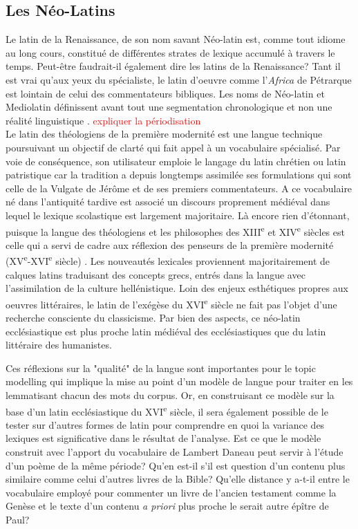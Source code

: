 \documentclass[11pt,french]{article}
\begin{document}
\subsection{Les Néo-Latins}
Le latin de la Renaissance, de son nom savant Néo-latin est, comme tout idiome au long cours, constitué de différentes strates de lexique accumulé à travers le temps. Peut-être faudrait-il également dire les latins de la Renaissance? Tant il est vrai qu'aux yeux du spécialiste, le latin d'oeuvre comme l'\textit{Africa} de Pétrarque  est lointain de celui des commentateurs bibliques. Les noms de Néo-latin et Mediolatin définissent avant tout une segmentation chronologique et non une réalité linguistique \cite[p.142]{tilgMedievalLatinNeoLatin2015}. \textcolor{red}{expliquer la périodisation}\\
Le latin des théologiens de la première modernité est une langue technique poursuivant un objectif de clarté qui fait appel à un vocabulaire spécialisé. Par voie de conséquence, son utilisateur emploie le langage du latin chrétien ou latin patristique car la tradition a depuis longtemps assimilée ses formulations qui sont celle de la Vulgate de Jérôme et de ses premiers commentateurs. A ce vocabulaire né dans l'antiquité tardive est associé un discours proprement médiéval dans lequel le lexique scolastique est largement majoritaire. Là encore rien d'étonnant, puisque la langue des théologiens et les philosophes des XIII\textsuperscript{e} et XIV\textsuperscript{e} siècles est celle qui a servi de cadre aux réflexion des penseurs de la première modernité (XV\textsuperscript{e}-XVI\textsuperscript{e} siècle) \cite[p.34-37]{blumPhilosophenphilosophieUndSchulphilosophie1998}. Les nouveautés lexicales proviennent majoritairement de calques latins traduisant des concepts grecs, entrés dans la langue avec l'assimilation de la culture hellénistique. Loin des enjeux esthétiques propres aux oeuvres littéraires, le latin de l'exégèse du XVI\textsuperscript{e} siècle ne fait pas l'objet d'une recherche consciente du classicisme. Par bien des aspects, ce néo-latin ecclésiastique est plus proche latin médiéval des ecclésiastiques que du latin littéraire des humanistes.\par
Ces réflexions sur la "qualité" de la langue sont importantes pour le topic modelling qui implique la mise au point d'un modèle de langue pour traiter en les lemmatisant chacun des mots du corpus. Or, en construisant ce modèle sur la base d'un latin ecclésiastique du XVI\textsuperscript{e} siècle, il sera également possible de le tester sur d'autres formes de latin pour comprendre en quoi la variance des lexiques est significative dans le résultat de l'analyse. Est ce que le modèle construit avec l'apport du vocabulaire de Lambert Daneau peut servir à l'étude d'un poème de la même période? Qu'en est-il s'il est question d'un contenu plus similaire comme celui d'autres livres de la Bible? Qu'elle distance y a-t-il entre le vocabulaire employé pour commenter un livre de l'ancien testament comme la Genèse et le texte d'un contenu \textit{a priori} plus proche le serait autre épître de Paul?\\
\end{document}
